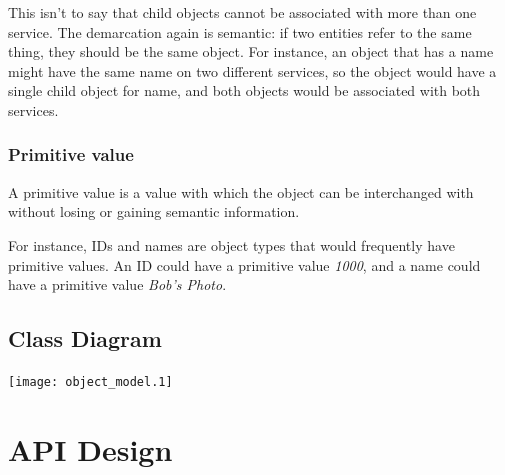 \documentclass{report}
\begin{document}
			This isn't to say that child objects cannot be associated with more 
			than one service. The demarcation again is semantic: if two 
			entities refer to the same thing, they should be the same object.
			For instance, an object that has a name might have the same name on 
			two different services, so the object would have a single child 
			object for name, and both objects would be associated with both 
			services.

		\subsubsection{Primitive value} 

			A primitive value is a value with which the object can be 
			interchanged with without losing or gaining semantic information.

			For instance, IDs and names are object types that would frequently 
			have primitive values. An ID could have a primitive value 
			\emph{1000}, and a name could have a primitive value \emph{Bob's 
			  Photo}.
		\subsection{Class Diagram}
			\texttt{[image: object\_model.1]}


	
	\section{API Design}
\end{document}
